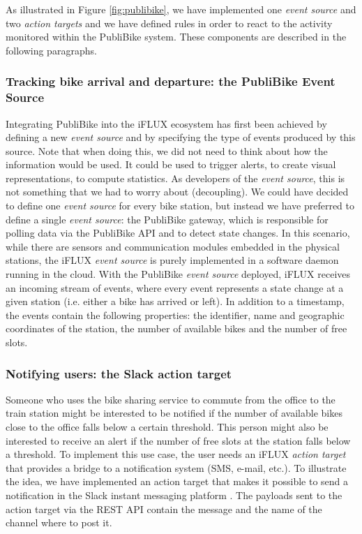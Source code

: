 As illustrated in Figure \ref{fig:publibike}, we have implemented one \emph{event source} and two \emph{action targets} and we have defined rules in order to react to the activity monitored within the PubliBike system. These components are described in the following paragraphs.

\subsubsection{Tracking bike arrival and departure: the PubliBike Event Source}
Integrating PubliBike into the iFLUX ecosystem has first been achieved by defining a new \emph{event source} and by specifying the type of events produced by this source. Note that when doing this, we did not need to think about how the information would be used. It could be used to trigger alerts, to create visual representations, to compute statistics. As developers of the \emph{event source}, this is not something that we had to worry about (decoupling). We could have decided to define one \emph{event source} for every bike station, but instead we have preferred to define a single \emph{event source}: the PubliBike gateway, which is responsible for polling data via the PubliBike API and to detect state changes. In this scenario, while there are sensors and communication modules embedded in the physical stations, the iFLUX \emph{event source} is purely implemented in a software daemon running in the cloud. With the PubliBike \emph{event source} deployed, iFLUX receives an incoming stream of events, where every event represents a state change at a given station (i.e. either a bike has arrived or left). In addition to a timestamp, the events contain the following properties: the identifier, name and geographic coordinates of the station, the number of available bikes and the number of free slots. 

\subsubsection{Notifying users: the Slack action target}
Someone who uses the bike sharing service to commute from the office to the train station might be interested to be notified if the number of available bikes close to the office falls below a certain threshold. This person might also be interested to receive an alert if the number of free slots at the station falls below a threshold. To implement this use case, the user needs an iFLUX \emph{action target} that provides a bridge to a notification system (SMS, e-mail, etc.). To illustrate the idea, we have implemented an action target that makes it possible to send a notification in the Slack instant messaging platform \cite{slack}. The payloads sent to the action target via the REST API contain the message and the name of the channel where to post it. 

